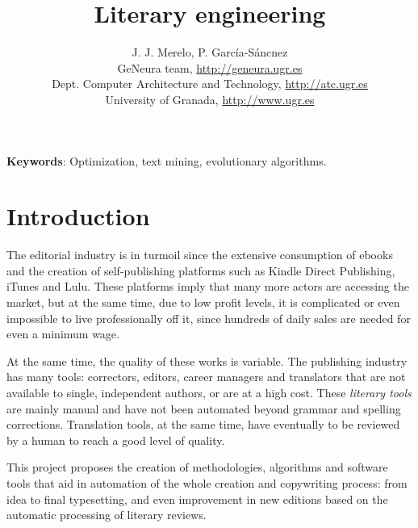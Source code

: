 \documentclass[a4paper]{article}
\begin{document}
\title{Literary engineering}

\author{J. J. Merelo, P. García-Sáncnez\\
GeNeura team, \url{http://geneura.ugr.es}\\
Dept. Computer Architecture and Technology, \url{http://atc.ugr.es}\\
University of Granada, \url{http://www.ugr.es}}

\onecolumn \maketitle \normalsize 



{\bf Keywords}: Optimization, text mining, evolutionary
algorithms.

\section{Introduction}

The editorial industry is in turmoil since the extensive consumption
of ebooks and the creation of self-publishing platforms such as Kindle
Direct Publishing, iTunes and Lulu. These platforms imply that many more actors are accessing the market, but at the same time, due to low profit levels, it is complicated or even impossible to live professionally off it, since hundreds of daily sales are needed for even a minimum wage.

At the same time, the quality of these works is variable. The
publishing industry has many tools: correctors, editors, career
managers and translators that are not available to single, independent
authors, or are at a high cost. These {\em literary tools} are mainly manual and have not been
automated beyond grammar and spelling corrections. Translation tools,
at the same time, have eventually to be reviewed by a human to reach a
good level of quality. 

This project proposes the creation of methodologies, algorithms and
software tools that aid in automation of the whole creation and
copywriting process:
from idea to final typesetting, and even improvement in new editions
based on the automatic processing of literary reviews. 
\end{document}
